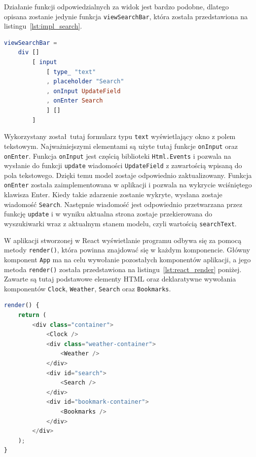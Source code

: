 \documentclass[twoside,a4paper]{report}
\begin{document}
Działanie funkcji odpowiedzialnych za widok jest bardzo podobne, dlatego opisana zostanie jedynie funkcja \texttt{viewSearchBar}, która została przedstawiona na listingu~\ref{lst:impl_search}.
\begin{lstlisting}[mathescape,caption={Implementacja funkcji \texttt{viewSearchBar}},label={lst:impl_search},language={Elm}]
viewSearchBar =
    div []
        [ input
            [ type_ "text"
            , placeholder "Search"
            , onInput UpdateField
            , onEnter Search
            ] []
        ]
\end{lstlisting}

Wykorzystany został tutaj formularz typu \texttt{text} wyświetlający okno z polem tekstowym.
Najważniejszymi elementami są użyte tutaj funkcje \texttt{onInput} oraz \texttt{onEnter}.
Funkcja \texttt{onInput} jest częścią biblioteki \texttt{Html.Events} i pozwala na wysłanie do funkcji \texttt{update} wiadomości \texttt{UpdateField} z zawartością wpisaną do pola tekstowego.
Dzięki temu model zostaje odpowiednio zaktualizowany.
Funkcja \texttt{onEnter} została zaimplementowana w aplikacji i pozwala na wykrycie wciśniętego klawisza Enter.
Kiedy takie zdarzenie zostanie wykryte, wysłana zostaje wiadomość \texttt{Search}.
Następnie wiadomość jest odpowiednio przetwarzana przez funkcję \texttt{update} i w wyniku aktualna strona zostaje przekierowana do wyszukiwarki wraz z aktualnym stanem modelu, czyli wartością \texttt{searchText}.

W aplikacji stworzonej w React wyświetlanie programu odbywa się za pomocą metody \texttt{render()}, która powinna znajdować się w każdym komponencie.
Główny komponent \texttt{App} ma na celu wywołanie pozostałych komponentów aplikacji, a jego metoda \texttt{render()} została przedstawiona na listingu~\ref{lst:react_render} poniżej.
Zawarte są tutaj podstawowe elementy HTML oraz deklaratywne wywołania komponentów \texttt{Clock}, \texttt{Weather}, \texttt{Search} oraz \texttt{Bookmarks}.

\begin{lstlisting}[caption={Metoda \texttt{render()} komponentu \texttt{App}},label={lst:react_render},language={JavaScript}]
render() {
    return (
        <div class="container">
            <Clock />
            <div class="weather-container">
                <Weather />
            </div>
            <div id="search">
                <Search />
            </div>
            <div id="bookmark-container">
                <Bookmarks />
            </div>
        </div>
    );
}
\end{lstlisting}
\end{document}
